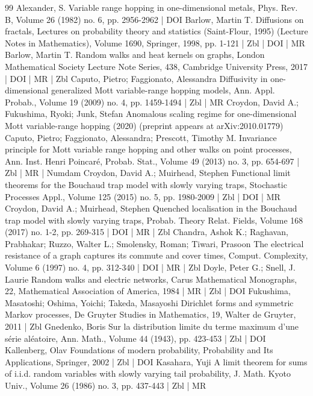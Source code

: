 \documentclass[10pt]{amsart}
\theoremstyle{definition}\newtheorem{defi}[theo]{Definition}\newtheorem{rema}[theo]{Remark}\newtheorem{exam}[theo]{Example}\newtheorem{exem}[theo]{Example}\newtheorem{nota}[theo]{Notation}
\begin{document}
\begin{thebibliography}{99}
 Alexander, S. Variable range hopping in one-dimensional metals, Phys. Rev. B, Volume 26 (1982) no. 6, pp. 2956-2962 | DOI
 Barlow, Martin T. Diffusions on fractals, Lectures on probability theory and statistics (Saint-Flour, 1995) (Lecture Notes in Mathematics), Volume 1690, Springer, 1998, pp. 1-121 | Zbl | DOI | MR
 Barlow, Martin T. Random walks and heat kernels on graphs, London Mathematical Society Lecture Note Series, 438, Cambridge University Press, 2017 | DOI | MR | Zbl
 Caputo, Pietro; Faggionato, Alessandra Diffusivity in one-dimensional generalized Mott variable-range hopping models, Ann. Appl. Probab., Volume 19 (2009) no. 4, pp. 1459-1494 | Zbl | MR
 Croydon, David A.; Fukushima, Ryoki; Junk, Stefan Anomalous scaling regime for one-dimensional Mott variable-range hopping (2020) (preprint appears at arXiv:2010.01779)
 Caputo, Pietro; Faggionato, Alessandra; Prescott, Timothy M. Invariance principle for Mott variable range hopping and other walks on point processes, Ann. Inst. Henri Poincaré, Probab. Stat., Volume 49 (2013) no. 3, pp. 654-697 | Zbl | MR | Numdam
 Croydon, David A.; Muirhead, Stephen Functional limit theorems for the Bouchaud trap model with slowly varying traps, Stochastic Processes Appl., Volume 125 (2015) no. 5, pp. 1980-2009 | Zbl | DOI | MR
 Croydon, David A.; Muirhead, Stephen Quenched localisation in the Bouchaud trap model with slowly varying traps, Probab. Theory Relat. Fields, Volume 168 (2017) no. 1-2, pp. 269-315 | DOI | MR | Zbl
 Chandra, Ashok K.; Raghavan, Prabhakar; Ruzzo, Walter L.; Smolensky, Roman; Tiwari, Prasoon The electrical resistance of a graph captures its commute and cover times, Comput. Complexity, Volume 6 (1997) no. 4, pp. 312-340 | DOI | MR | Zbl
 Doyle, Peter G.; Snell, J. Laurie Random walks and electric networks, Carus Mathematical Monographs, 22, Mathematical Association of America, 1984 | MR | Zbl | DOI
 Fukushima, Masatoshi; Oshima, Yoichi; Takeda, Masayoshi Dirichlet forms and symmetric Markov processes, De Gruyter Studies in Mathematics, 19, Walter de Gruyter, 2011 | Zbl
 Gnedenko, Boris Sur la distribution limite du terme maximum d’une série aléatoire, Ann. Math., Volume 44 (1943), pp. 423-453 | Zbl | DOI
 Kallenberg, Olav Foundations of modern probability, Probability and Its Applications, Springer, 2002 | Zbl | DOI
 Kasahara, Yuji A limit theorem for sums of i.i.d. random variables with slowly varying tail probability, J. Math. Kyoto Univ., Volume 26 (1986) no. 3, pp. 437-443 | Zbl | MR

\end{thebibliography}
\end{document}
